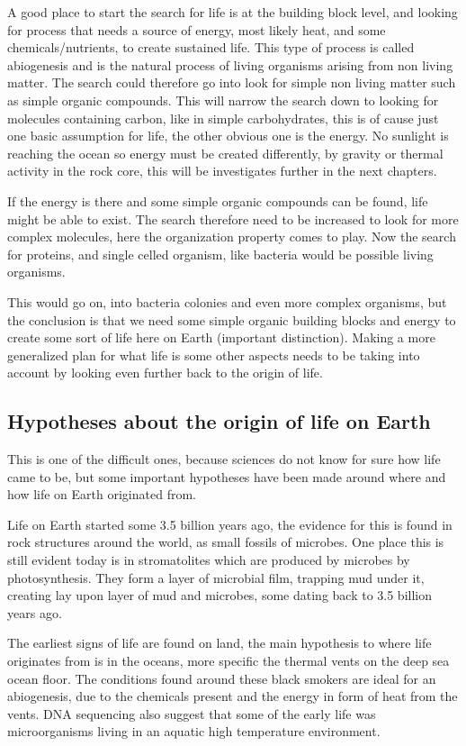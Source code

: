 A good place to start the search for life is at the building block level, and looking for process that needs a source of energy, most likely heat, and some chemicals/nutrients, to create sustained life. This type of process is called abiogenesis\cite{Abiogenesis} and is the natural process of living organisms arising from non living matter. The search could therefore go into look for simple non living matter such as simple organic compounds. This will narrow the search down to looking for molecules containing carbon, like in simple carbohydrates, this is of cause just one basic assumption for life, the other obvious one is the energy. No sunlight is reaching the ocean so energy must be created differently, by gravity or thermal activity in the rock core, this will be investigates further in the next chapters.

If the energy is there and some simple organic compounds can be found, life might be able to exist. The search therefore need to be increased to look for more complex molecules, here the organization property comes to play.  Now the search for proteins, and single celled organism, like bacteria would be possible living organisms.

This would go on, into bacteria colonies and even more complex organisms, but the conclusion is that we need some simple organic building blocks and energy to create some sort of life here on Earth (important distinction). Making a more generalized plan for what life is some other aspects needs to be taking into account by looking even further back to the origin of life.

\subsection{Hypotheses about the origin of life on Earth}

This is one of the difficult ones, because sciences do not know for sure how life came to be, but some important hypotheses have been made around where and how life on Earth originated from.

Life on Earth started some 3.5 billion years ago, the evidence for this is found in rock structures around the world, as small fossils of microbes. One place this is still evident today is in stromatolites which are produced by microbes by photosynthesis. They form a layer of microbial film, trapping mud under it, creating lay upon layer of mud and microbes, some dating back to 3.5 billion years ago.

The earliest signs of life are found on land, the main hypothesis to where life originates from is in the oceans, more specific the thermal vents on the deep sea ocean floor. The conditions found around these black smokers are ideal for an abiogenesis, due to the chemicals present and the energy in form of heat from the vents. DNA sequencing also suggest that some of the early life was microorganisms living in an aquatic high temperature environment.

